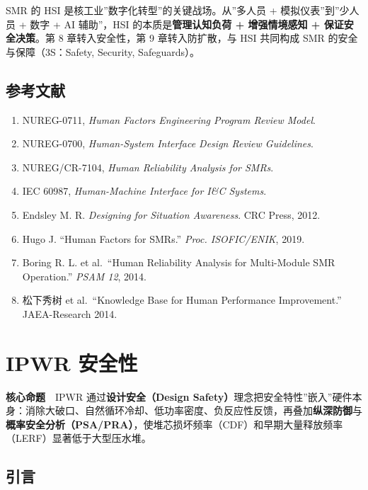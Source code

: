 \documentclass[
  UTF8,
  scheme=plain,
  fontsize=10pt,
  openany
]{ctexbook}
\begin{document}
SMR 的 HSI 是核工业''数字化转型''的关键战场。从''多人员 +
模拟仪表''到''少人员 + 数字 + AI 辅助''，HSI
的本质是\textbf{管理认知负荷 + 增强情境感知 + 保证安全决策}。第 8
章转入安全性，第 9 章转入防扩散，与 HSI 共同构成 SMR
的安全与保障（3S：Safety, Security, Safeguards）。

\section{参考文献}\label{ux53c2ux8003ux6587ux732e-6}

\begin{enumerate}
\def\labelenumi{\arabic{enumi}.}
\tightlist
\item
  NUREG-0711, \emph{Human Factors Engineering Program Review Model}.
\item
  NUREG-0700, \emph{Human-System Interface Design Review Guidelines}.
\item
  NUREG/CR-7104, \emph{Human Reliability Analysis for SMRs}.
\item
  IEC 60987, \emph{Human-Machine Interface for I\&C Systems}.
\item
  Endsley M. R. \emph{Designing for Situation Awareness}. CRC Press,
  2012.
\item
  Hugo J. ``Human Factors for SMRs.'' \emph{Proc. ISOFIC/ENIK}, 2019.
\item
  Boring R. L. et al.~``Human Reliability Analysis for Multi-Module SMR
  Operation.'' \emph{PSAM 12}, 2014.
\item
  松下秀树 et al.~``Knowledge Base for Human Performance Improvement.''
  JAEA-Research 2014.
\end{enumerate}

\cleardoublepage

\chapter{IPWR 安全性}\label{ipwr-ux5b89ux5168ux6027}

\begin{epigraph}

\textbf{核心命题}　IPWR 通过\textbf{设计安全（Design
Safety）}理念把安全特性''嵌入''硬件本身：消除大破口、自然循环冷却、低功率密度、负反应性反馈，再叠加\textbf{纵深防御}与\textbf{概率安全分析（PSA/PRA）}，使堆芯损坏频率（CDF）和早期大量释放频率（LERF）显著低于大型压水堆。

\end{epigraph}

\section{引言}\label{ux5f15ux8a00-7}
\end{document}
